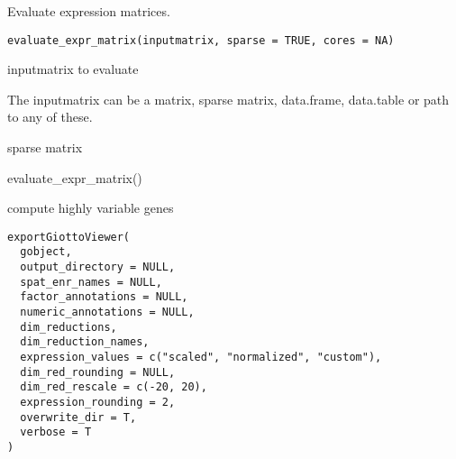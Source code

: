 \documentclass[a4paper]{book}
\begin{document}
%
\begin{Description}\relax
Evaluate expression matrices.
\end{Description}
%
\begin{Usage}
\begin{verbatim}
evaluate_expr_matrix(inputmatrix, sparse = TRUE, cores = NA)
\end{verbatim}
\end{Usage}
%
\begin{Arguments}
\begin{ldescription}
\item[\code{inputmatrix}] inputmatrix to evaluate
\end{ldescription}
\end{Arguments}
%
\begin{Details}\relax
The inputmatrix can be a matrix, sparse matrix, data.frame, data.table or path to any of these.
\end{Details}
%
\begin{Value}
sparse matrix
\end{Value}
%
\begin{Examples}
\begin{ExampleCode}
    evaluate_expr_matrix()
\end{ExampleCode}
\end{Examples}
%
\begin{Description}\relax
compute highly variable genes
\end{Description}
%
\begin{Usage}
\begin{verbatim}
exportGiottoViewer(
  gobject,
  output_directory = NULL,
  spat_enr_names = NULL,
  factor_annotations = NULL,
  numeric_annotations = NULL,
  dim_reductions,
  dim_reduction_names,
  expression_values = c("scaled", "normalized", "custom"),
  dim_red_rounding = NULL,
  dim_red_rescale = c(-20, 20),
  expression_rounding = 2,
  overwrite_dir = T,
  verbose = T
)
\end{verbatim}
\end{Usage}
%
\end{document}
